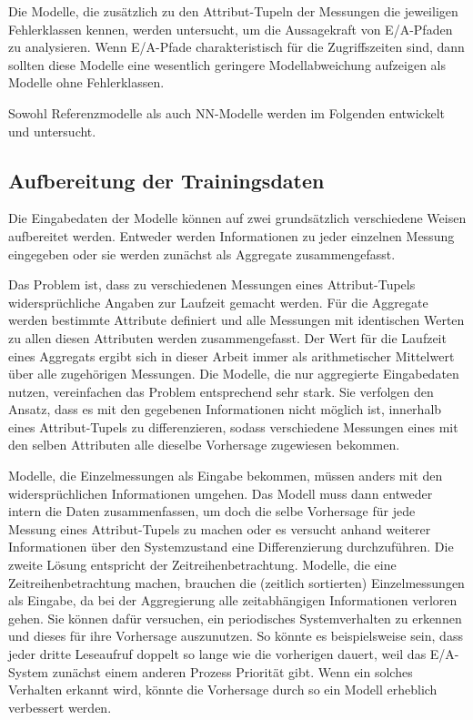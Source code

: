 \documentclass[
	12pt,
	a4paper,
	BCOR10mm,
	DIV14,
	listof=totoc,
	bibliography=totoc,
	headsepline
]{scrreprt}
\begin{document}
Die Modelle, die zusätzlich zu den Attribut-Tupeln der Messungen die jeweiligen Fehlerklassen kennen, werden untersucht, um die Aussagekraft von E/A-Pfaden zu analysieren.
Wenn E/A-Pfade charakteristisch für die Zugriffszeiten sind, dann sollten diese Modelle eine wesentlich geringere Modellabweichung aufzeigen als Modelle ohne Fehlerklassen.

Sowohl Referenzmodelle als auch NN-Modelle werden im Folgenden entwickelt und untersucht.
\subsection{Aufbereitung der Trainingsdaten}

Die Eingabedaten der Modelle können auf zwei grundsätzlich verschiedene Weisen aufbereitet werden.
Entweder werden Informationen zu jeder einzelnen Messung eingegeben oder sie werden zunächst als Aggregate zusammengefasst.\medskip

Das Problem ist, dass zu verschiedenen Messungen eines Attribut-Tupels \glqq widersprüchliche\grqq{} Angaben zur Laufzeit gemacht werden. 
Für die Aggregate werden bestimmte Attribute definiert und alle Messungen mit identischen Werten zu allen diesen Attributen werden zusammengefasst.
Der Wert für die Laufzeit eines Aggregats ergibt sich in dieser Arbeit immer als arithmetischer Mittelwert über alle zugehörigen Messungen.
Die Modelle, die nur aggregierte Eingabedaten nutzen, vereinfachen das Problem entsprechend sehr stark. Sie verfolgen den Ansatz, dass es mit den gegebenen Informationen nicht möglich ist, innerhalb eines Attribut-Tupels zu differenzieren, sodass verschiedene Messungen eines mit den selben Attributen alle dieselbe Vorhersage zugewiesen bekommen.

Modelle, die Einzelmessungen als Eingabe bekommen, müssen anders mit den \glqq widersprüchlichen\grqq{} Informationen umgehen.
Das Modell muss dann entweder intern die Daten zusammenfassen, um doch die selbe Vorhersage für jede Messung eines Attribut-Tupels zu machen oder es versucht anhand weiterer Informationen über den Systemzustand eine Differenzierung durchzuführen.
Die zweite Lösung entspricht der Zeitreihenbetrachtung.
Modelle, die eine Zeitreihenbetrachtung machen, brauchen die (zeitlich sortierten) Einzelmessungen als Eingabe, da bei der Aggregierung alle zeitabhängigen Informationen verloren gehen.
Sie können dafür versuchen, ein periodisches Systemverhalten zu erkennen und dieses für ihre Vorhersage auszunutzen. So könnte es beispielsweise sein, dass jeder dritte Leseaufruf doppelt so lange wie die vorherigen dauert, weil das E/A-System zunächst einem anderen Prozess Priorität gibt.
Wenn ein solches Verhalten erkannt wird, könnte die Vorhersage durch so ein Modell erheblich verbessert werden.
\end{document}
